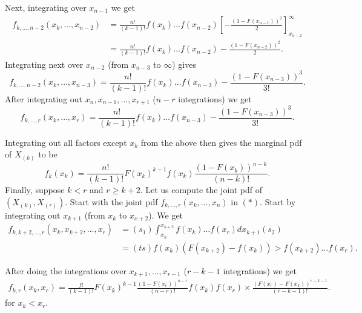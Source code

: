 Next, integrating over $x_{n - 1}$ we get 
\begin{align*}
	f_{k, \ldots, n - 2}\left( x_{k} , \ldots , x_{n - 2} \right) &= \frac{n!}{\left( k - 1 \right) !} f\left( x_{k } \right) \ldots f \left( x _{n - 2} \right) \left[ - \frac{\left( 1 - F\left( x_{n -1} \right)  \right) ^2}{2} \right] ^{\infty}_{x _{n -2}}\\
								      &= \frac{n!}{\left( k - 1 \right) !} f\left( x_{k} \right) \ldots f \left( x_{n - 2} \right)  - \frac{\left( 1 - F\left( x_{n -2} \right)  \right) ^2}{2}
.\end{align*}
Integrating next over $x_{n - 2}$ (from $x_{n - 3}$ to $\infty$) gives 
\[
		f_{k, \ldots, n - 2}\left( x_{k} , \ldots , x_{n - 3} \right)=    \frac{n!}{\left( k - 1 \right) !} f\left( x_{k} \right) \ldots f \left( x_{n - 3} \right)  - \frac{\left( 1 - F\left( x_{n -3} \right)  \right) ^3}{3!}
.\] 
After integrating out $x_{n}, x_{n-1} , \ldots ,  x_{r+1}$ ($n - r$ integrations) we get 
\[
		f_{k, \ldots, r}\left( x_{k} , \ldots , x_{r} \right)=    \frac{n!}{\left( k - 1 \right) !} f\left( x_{k} \right) \ldots f \left( x_{n - 3} \right)  - \frac{\left( 1 - F\left( x_{n -3} \right)  \right) ^3}{3!}
.\] 


Integrating out all factors except $x_{k}$ from the above then gives the marginal pdf of $X_{\left( k \right) }$ to be 
\[
	f_{k}\left( x_k \right) = \frac{n!}{\left( k - 1 \right) !} F\left( x_{k} \right) ^{k - 1}f\left( x_{k} \right) \frac{\left( 1 - F\left( x_{k} \right)  \right) ^{n - k}}{\left( n - k \right) !}
.\] 
Finally, suppose $k < r$ and $r \ge  k + 2$. Let us compute the joint pdf of $\left( X_{\left( k \right) }, X_{\left( r \right) } \right) $. Start with the joint pdf $f_{k , \ldots, r}\left( x_{k} , \ldots , x_{n} \right) $ in $\left( * \right) $. Start by integrating out $x_{k + 1}$ (from $x_k$ to $x_{x + 2}$). We get 
\begin{align*}
	f_{k, k + 2, \ldots, r }\left( x_k, x_{k + 2}, \ldots, x _{r} \right) &= \left( s_1 \right) \int_{x_k}^{x_{k + 2}} f\left( x_k \right) \ldots f\left( x_r \right) dx_{k + 1} \left( s_2 \right) \\ 
									      &= \left( ts \right) f\left( x_k \right) \left( F\left( x_{k + 2} \right) - f\left( x_k \right)  \right) > f\left( x _{k + 2} \right) \ldots f \left( x_{r} \right)  
.\end{align*}

After doing the integrations over $x_{k+1} , \ldots , x_{r-1}$ ($r - k - 1$ integrations) we get 
\begin{align*}
	f_{k, r}\left( x_{k}, x_{r} \right) = \frac{f!}{\left( k - 1 \right) !}F\left( x_{k} \right) ^{k - 1} \frac{\left( 1 - F\left( x _{r} \right)  \right) ^{n - r}}{\left( n - r \right) !}f\left( x _{k} \right) f\left( x _{r} \right)  \times \frac{\left( F\left( x_{r} \right) - F\left( x_{k} \right)  \right) ^{r - k - 1}}{\left( r - k - 1 \right) !}
.\end{align*}
for $x_{k}< x_{r}$. 
